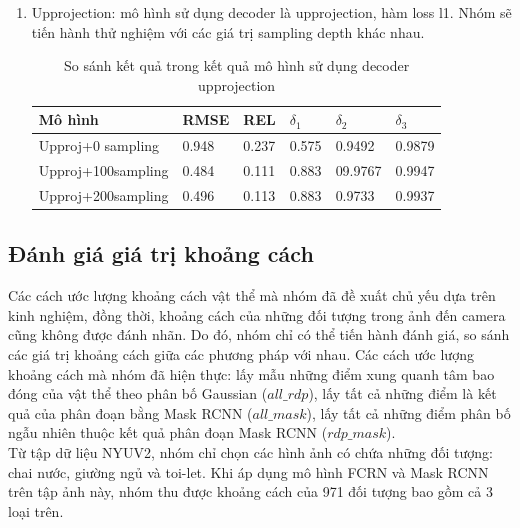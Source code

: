 \begin{enumerate}
\item Upprojection: mô hình sử dụng decoder là  upprojection, hàm loss l1. Nhóm sẽ tiến hành thử nghiệm với các giá trị sampling depth khác nhau. 
\begin{table}[H]
\centering
\begin{tabular}{ |p{4cm}|p{2.5cm}|p{2cm}|p{1cm}|p{1cm}|p{1cm}|   }
\hline
Mô hình & RMSE &  REL & $\delta_1$ & $\delta_2$ & $\delta_3$ \\
\hline
Upproj+0 sampling & 0.948 & 0.237 & 0.575 & 0.9492 & 0.9879 \\
\hline
Upproj+100sampling & 0.484 &  0.111  & 0.883 & 09.9767 & 0.9947\\
\hline
Upproj+200sampling & 0.496& 0.113 & 0.883 & 0.9733 & 0.9937 \\
\hline
\end{tabular}
\caption{So sánh kết quả trong kết quả mô hình sử dụng decoder upprojection}
\label{tab:upproj}
\end{table}
 
\end{enumerate}

\subsection{Đánh giá giá trị khoảng cách}
Các cách ước lượng khoảng cách vật thể mà nhóm đã đề xuất chủ yếu dựa trên kinh nghiệm, đồng thời, khoảng cách của những đối tượng trong ảnh đến camera cũng không được đánh nhãn. Do đó, nhóm chỉ có thể tiến hành đánh giá, so sánh các giá trị khoảng cách giữa các phương pháp với nhau. Các cách ước lượng khoảng cách mà nhóm đã hiện thực: lấy mẫu những điểm xung quanh tâm bao đóng của vật thể theo phân bố Gaussian ($all\_rdp$), lấy tất cả những điểm là kết quả của phân đoạn bằng Mask RCNN ($all\_mask$), lấy tất cả những điểm phân bố ngẫu nhiên thuộc kết quả phân đoạn Mask RCNN ($rdp\_mask$). \\ 

Từ tập dữ liệu NYUV2, nhóm chỉ chọn các hình ảnh có chứa những đối tượng: chai nước, giường ngủ và toi-let. Khi áp dụng mô hình FCRN và Mask RCNN trên tập ảnh này, nhóm thu được khoảng cách của 971 đối tượng bao gồm cả 3 loại trên. \\

